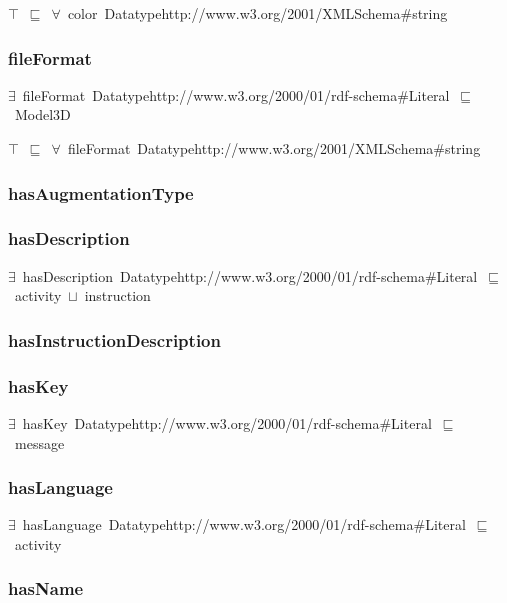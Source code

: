 \documentclass{article}
\begin{document}
\ensuremath{\top}~\ensuremath{\sqsubseteq}~\ensuremath{\forall}~color~Datatypehttp://www.w3.org/2001/XMLSchema#string

\subsubsection*{fileFormat}

\ensuremath{\exists}~fileFormat~Datatypehttp://www.w3.org/2000/01/rdf-schema#Literal~\ensuremath{\sqsubseteq}~Model3D

\ensuremath{\top}~\ensuremath{\sqsubseteq}~\ensuremath{\forall}~fileFormat~Datatypehttp://www.w3.org/2001/XMLSchema#string

\subsubsection*{hasAugmentationType}

\subsubsection*{hasDescription}

\ensuremath{\exists}~hasDescription~Datatypehttp://www.w3.org/2000/01/rdf-schema#Literal~\ensuremath{\sqsubseteq}~activity~\ensuremath{\sqcup}~instruction

\subsubsection*{hasInstructionDescription}

\subsubsection*{hasKey}

\ensuremath{\exists}~hasKey~Datatypehttp://www.w3.org/2000/01/rdf-schema#Literal~\ensuremath{\sqsubseteq}~message

\subsubsection*{hasLanguage}

\ensuremath{\exists}~hasLanguage~Datatypehttp://www.w3.org/2000/01/rdf-schema#Literal~\ensuremath{\sqsubseteq}~activity

\subsubsection*{hasName}
\end{document}
